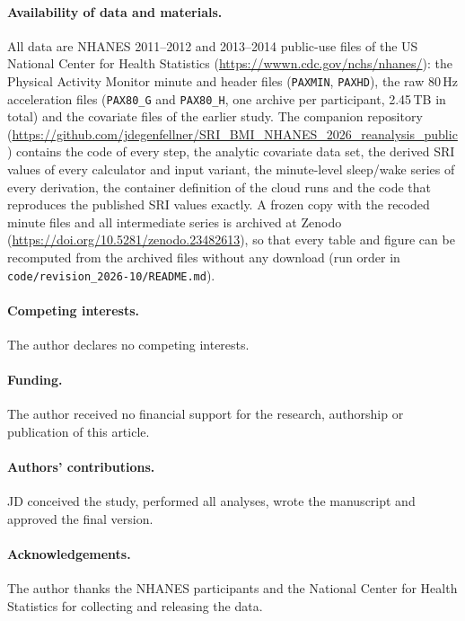 \documentclass[12pt]{article}
\begin{document}
\paragraph{Availability of data and materials.} All data are NHANES 2011--2012 and 2013--2014
public-use files of the US National Center for Health Statistics
(\url{https://wwwn.cdc.gov/nchs/nhanes/}): the Physical Activity Monitor minute
and header files (\texttt{PAXMIN}, \texttt{PAXHD}), the raw 80\,Hz
acceleration files (\texttt{PAX80\_G} and \texttt{PAX80\_H}, one archive per
participant, 2.45\,TB in total) and the covariate files of the earlier study.
The companion repository
(\url{https://github.com/jdegenfellner/SRI_BMI_NHANES_2026_reanalysis_public})
contains the code of every step, the analytic covariate data set, the derived
SRI values of every calculator and input variant, the minute-level sleep/wake
series of every derivation, the container definition of the cloud runs and the
code that reproduces the published SRI values exactly. A frozen copy with the
recoded minute files and all intermediate series is archived at Zenodo
(\url{https://doi.org/10.5281/zenodo.23482613}), so that every table and figure can be recomputed from the archived files without any download (run order in \texttt{code/revision\_2026-10/README.md}).

\paragraph{Competing interests.} The author declares no competing interests.

\paragraph{Funding.} The author received no financial support for the research, authorship or publication of this article.

\paragraph{Authors' contributions.} JD conceived the study, performed all analyses,
wrote the manuscript and approved the final version.

\paragraph{Acknowledgements.} The author thanks the NHANES participants and the
National Center for Health Statistics for collecting and releasing the data.
\end{document}

